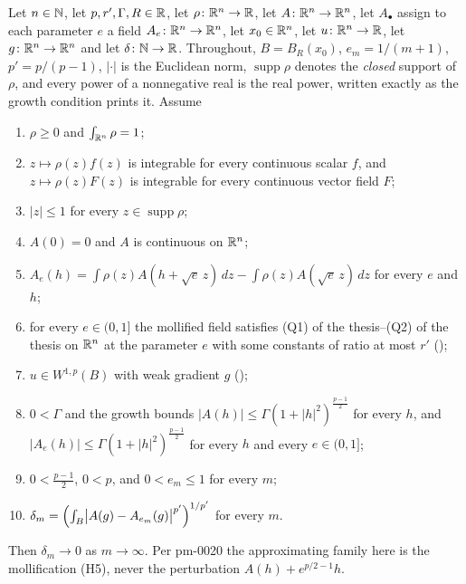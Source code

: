 \begin{helper}
Let $n\in\mathbb{N}$, let $p,r',\Gamma,R\in\mathbb{R}$, let $\rho\colon\mathbb{R}^n\to\mathbb{R}$, let
$A\colon\mathbb{R}^n\to\mathbb{R}^n$, let $A_\bullet$ assign to each parameter $e$ a field
$A_e\colon\mathbb{R}^n\to\mathbb{R}^n$, let $x_0\in\mathbb{R}^n$, let $u\colon\mathbb{R}^n\to\mathbb{R}$, let
$g\colon\mathbb{R}^n\to\mathbb{R}^n$ and let $\delta\colon\mathbb{N}\to\mathbb{R}$.  Throughout,
$B=B_R(x_0)$, $e_m=1/(m+1)$, $p'=p/(p-1)$, $|\cdot|$ is the Euclidean norm,
$\operatorname{supp}\rho$ denotes the \emph{closed} support of $\rho$, and
every power of a nonnegative real is the real power, written exactly as the
growth condition prints it.  Assume
\begin{enumerate}
\item[(H1)] $\rho\ge0$ and $\int_{\mathbb{R}^n}\rho=1$;
\item[(H2)] $z\mapsto\rho(z)f(z)$ is integrable for every continuous scalar $f$,
  and $z\mapsto\rho(z)F(z)$ is integrable for every continuous vector field $F$;
\item[(H3)] $|z|\le1$ for every $z\in\operatorname{supp}\rho$;
\item[(H4)] $A(0)=0$ and $A$ is continuous on $\mathbb{R}^n$;
\item[(H5)] $A_e(h)=\int\rho(z)A(h+\sqrt e\,z)\,dz-\int\rho(z)A(\sqrt e\,z)\,dz$
  for every $e$ and $h$;
\item[(H6)] for every $e\in(0,1]$ the mollified field satisfies
  (Q1) of the thesis--(Q2) of the thesis on $\mathbb{R}^n$ at the parameter $e$ with some
  constants of ratio at most $r'$ ();
\item[(H7)] $u\in W^{1,p}(B)$ with weak gradient $g$ ();
\item[(H8)] $0<\Gamma$ and the growth bounds
  $|A(h)|\le\Gamma(1+|h|^2)^{\frac{p-1}2}$ for every $h$, and
  $|A_e(h)|\le\Gamma(1+|h|^2)^{\frac{p-1}2}$ for every $h$ and every
  $e\in(0,1]$;
\item[(H9)] $0<\tfrac{p-1}2$, $0<p$, and $0<e_m\le1$ for every $m$;
\item[(H10)] $\delta_m=\Bigl(\int_B\bigl|A(g)-A_{e_m}(g)\bigr|^{p'}\Bigr)^{1/p'}$
  for every $m$.
\end{enumerate}
Then $\delta_m\to0$ as $m\to\infty$.
Per pm-0020 the approximating family here is the mollification (H5), never the
perturbation $A(h)+e^{p/2-1}h$.
\end{helper}
